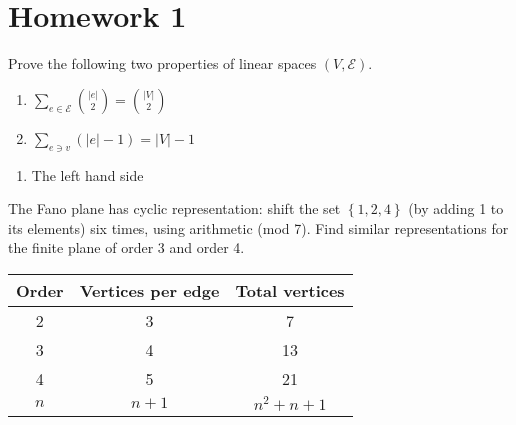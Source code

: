 \documentclass[class=article, crop=false]{standalone}
\begin{document}
\section{Homework 1}
\begin{prob}
    Prove the following two properties of linear spaces $(V, \mathcal{E})$.
    \begin{enumerate}
        \item $\sum_{e \in \mathcal{E}} \binom{|e|}{2}= \binom{|V|}{2}$
        \item $\sum_{e \ni v} \left( |e|-1 \right) =|V|-1$
    \end{enumerate}
\end{prob}

\begin{enumerate}
    \item The left hand side 
\end{enumerate}

\begin{prob}
    The Fano plane has cyclic representation: shift the set $ \left\{ 1,2,4 \right\}$ (by adding 1 to its elements) six times, using arithmetic (mod 7). Find similar representations for the finite plane of order 3 and order 4.
\end{prob}

\begin{center}
    \begin{tabular}{|c|c|c|}
        \hline
        Order & Vertices per edge & Total vertices \\
        \hline
        2 & 3 & 7 \\
        3 & 4 & 13 \\
        4 & 5 & 21 \\
        $n$ & $n+1$ & $n^2+n+1$ \\
        \hline
    \end{tabular}
\end{center}
\end{document}
